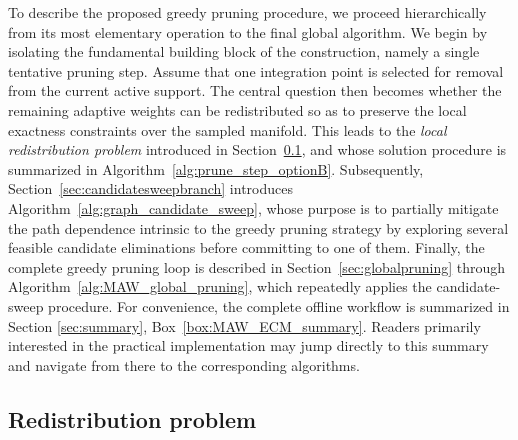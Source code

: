 \documentclass[preprint,10pt]{elsarticle}  %
\begin{document}
To describe the proposed   greedy pruning procedure, we proceed
hierarchically from its most elementary operation to the final global
algorithm. We begin by isolating the fundamental building block of the
construction, namely a single tentative pruning step. Assume that one
integration point is selected for removal from the current active
support. The central question then becomes whether the remaining
adaptive weights can be redistributed so as to preserve the local
exactness constraints over the sampled manifold. This leads to the
\emph{local redistribution problem} introduced in
Section~\ref{sec:redistributionPR}, and  whose solution procedure is
summarized in Algorithm~\ref{alg:prune_step_optionB}.  Subsequently,
Section~\ref{sec:candidatesweepbranch} introduces
Algorithm~\ref{alg:graph_candidate_sweep}, whose purpose is to partially
mitigate the path dependence intrinsic to the greedy pruning strategy by
exploring several feasible candidate eliminations before committing to
one of them. Finally, the complete greedy pruning loop is described in
Section~\ref{sec:globalpruning} through
Algorithm~\ref{alg:MAW_global_pruning}, which repeatedly applies the
candidate-sweep procedure.  For convenience, the complete offline workflow is summarized in Section \ref{sec:summary},
Box~\ref{box:MAW_ECM_summary}. Readers primarily interested in the
practical implementation may jump directly to this summary and navigate
from there to the corresponding algorithms.


 \subsection{Redistribution problem}
\label{sec:redistributionPR}

%
%
\end{document}
